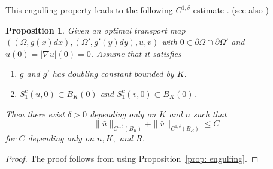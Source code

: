 \documentclass[12pt,reqno]{amsart}
\newtheorem{prop}{Proposition}[section]
\numberwithin{equation}{section}
\begin{document}
This engulfing property leads to the following $C^{1, \delta}$ estimate \cite{Caffarelli2, Jhaveri-Savin}. (see also \cite{Savin-Yu})    

\begin{prop}\label{prop: C1-delta-estimate}
        Given an optimal transport map $((\Omega, g(x)dx), (\Omega', g'(y)dy), u, v)$ with $0\in\partial\Omega\cap \partial\Omega'$ and $u(0) = |\nabla u|(0) = 0$. Assume that it satisfies
        \begin{enumerate}
            \item $g$ and $g'$ has doubling constant bounded by $K$.
            \item $S_1^c(u, 0)\subset B_K(0)$ and $S_1^c(v, 0)\subset B_K(0)$. 
        \end{enumerate}
        Then there exist $\delta>0$ depending only on $K$ and $n$ such that
        \[\|\bar u\|_{C^{1, \delta}(B_R)}+\|\bar v\|_{C^{1, \delta}(B_R)}\leq C \]
        for $C$ depending only on $n, K, $ and $R$. 
    \end{prop}
    \begin{proof}
        The proof follows from \cite[Proposition 2.5, Remark 2.1]{Savin-Yu} using Proposition~\ref{prop: engulfing}. 
    \end{proof}
\end{document}
